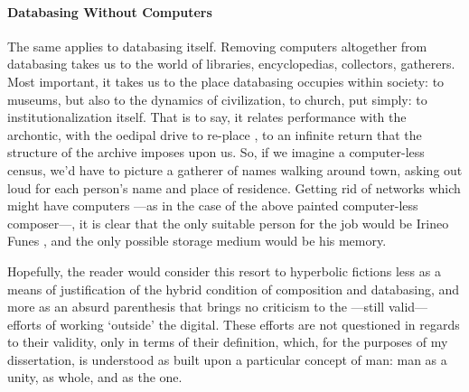 \paragraph{Databasing Without Computers}
The same applies to databasing itself. Removing computers altogether from databasing takes us to the world of libraries, encyclopedias, collectors, gatherers. Most important, it takes us to the place databasing occupies within society: to museums, but also to the dynamics of civilization, to church, put simply: to institutionalization itself. That is to say, it relates performance with the archontic, with the oedipal drive to re-place , to an infinite return that the structure of the archive imposes upon us. So, if we imagine a computer-less census, we'd have to picture a gatherer of names walking around town, asking out loud for each person's name and place of residence. Getting rid of networks which might have computers ---as in the case of the above painted computer-less composer---, it is clear that the only suitable person for the job would be Irineo Funes , and the only possible storage medium would be his memory. 

Hopefully, the reader would consider this resort to hyperbolic fictions less as a means of justification of the hybrid condition of composition and databasing, and more as an absurd parenthesis that brings no criticism to the ---still valid--- efforts of working `outside' the digital. These efforts are not questioned in regards to their validity, only in terms of their definition, which, for the purposes of my dissertation, is understood as built upon a particular concept of man: man as a unity, as whole, and as the one.